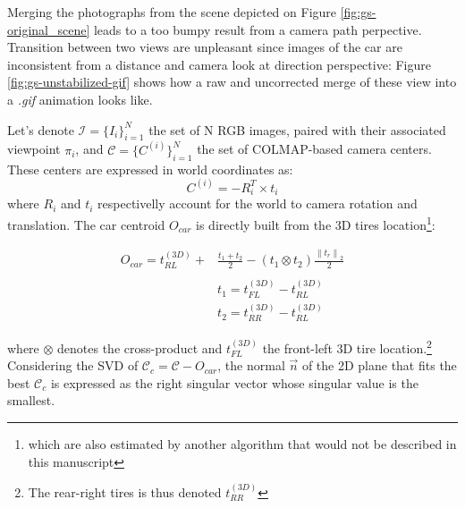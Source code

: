 Merging the photographs from the scene depicted on Figure \ref{fig:gs-original_scene} leads to a too bumpy result from a camera path perpective. Transition between two views are unpleasant since images of the car are inconsistent from a distance and camera look at direction perspective: Figure \ref{fig:gs-unstabilized-gif} shows how a raw and uncorrected merge of these view into a \textit{.gif} animation looks like. 

\begin{center}
  \label{fig:gs-unstabilized-gif}
\end{center}

Let's denote $\mathcal{I}=\{I_{i}\}_{i=1}^{N}$ the set of N RGB images, paired with their associated viewpoint $\pi_{i}$, and  $\mathcal{C} = \{C^{(i)}\}_{i=1}^{N}$ the set of COLMAP-based camera centers. These centers are expressed in world coordinates as: 
\begin{equation}
  C^{(i)}=-R_{i}^{T}\times t_{i}
\end{equation}
 where $R_{i}$ and $t_{i}$ respectivelly account for the world to camera rotation and translation. The car centroid $O_{car}$ is directly built from the 3D tires location\footnote{which are also estimated by another algorithm that would not be described in this manuscript}: 

\begin{equation}
  \begin{split}
  O_{car} = t_{RL}^{(3D)} + & \frac{t_{1}+t_{2}}{2} -(t_{1}\otimes t_{2})\frac{\left\lVert t_{r}\right\lVert_{2}}{2} \\ \\
  & t_{1} = t_{FL}^{(3D)} - t_{RL}^{(3D)} \\
  & t_{2} = t_{RR}^{(3D)} - t_{RL}^{(3D)} 
  \end{split}
  \end{equation}

where $\otimes$ denotes the cross-product and $t_{FL}^{(3D)}$ the front-left 3D tire location.\footnote{The rear-right tires is thus denoted $t_{RR}^{(3D)}$} Considering the \ac{SVD} of $\mathcal{C}_{c} = \mathcal{C} - O_{car}$, the normal $\vec{n}$ of the 2D plane that fits the best $\mathcal{C}_{c}$ is expressed as the right singular vector whose singular value is the smallest. 

